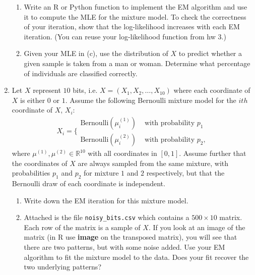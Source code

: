 \documentclass{article}
\begin{document}
\begin{enumerate}
\begin{enumerate}
\item Write an R or Python function to implement the EM algorithm and use it to compute the MLE for the mixture model.  To check the correctness of your iteration, show that the log-likelihood increases with each EM iteration.  (You can reuse your log-likelihood function from hw $3$.)   
\item Given your MLE in (c), use the distribution of $X$ to predict whether a given sample is taken from a man or woman.    Determine what percentage of individuals are classified correctly. 
\end{enumerate}

\item Let $X$ represent $10$ bits, i.e. $X = (X_1, X_2, \dots, X_{10})$ where each coordinate of $X$ is either $0$ or $1$.  Assume the following Bernoulli mixture model for the $ith$ coordinate of $X$, $X_i$:
\begin{equation}
X_i = \bigg\{
\begin{array}{cc}
\text{Bernoulli}(\mu^{(1)}_i) & \text{ with probability } p_1 \\
\text{Bernoulli}(\mu^{(2)}_i) & \text{ with probability } p_2,
\end{array}
\end{equation}
where $\mu^{(1)}, \mu^{(2)} \in \mathbb{R}^{10}$ with all coordinates in $[0,1]$.  Assume further that the coordinates of $X$ are always sampled from the same mixture, with probabilities $p_1$ and $p_2$ for mixture $1$ and $2$ respectively, but that the Bernoulli draw of each coordinate is independent.  
\begin{enumerate}
\item Write down the EM iteration for this mixture model.  
\item Attached is the file \verb+noisy_bits.csv+ which contains a $500 \times 10$ matrix.  Each row of the matrix is a sample of $X$.   If you look at an image of the matrix (in R use \textbf{image} on the transposed matrix), you will see that there are two patterns, but with some noise added.   Use your EM algorithm to fit the mixture model to the data.  Does your fit recover the two underlying patterns?
\end{enumerate}

\end{enumerate}
\end{document}
